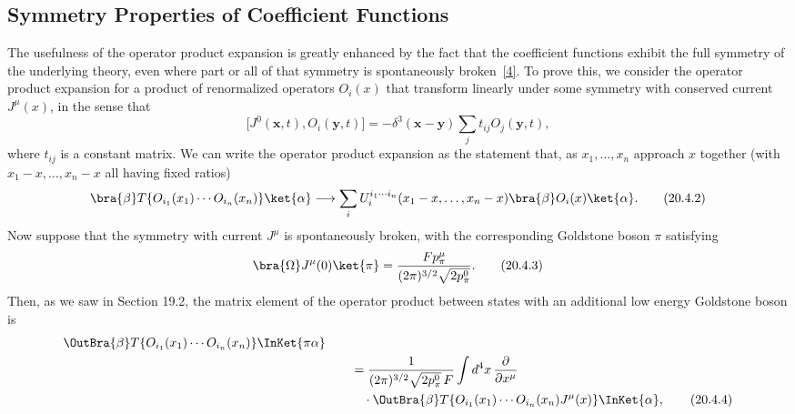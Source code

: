 
\subsection{Symmetry Properties of Coefficient Functions}

The usefulness of the operator product expansion is greatly enhanced by the fact that the coefficient functions exhibit the full symmetry of the underlying theory, even where part or all of that symmetry is spontaneously broken~\hyperref[ch20-ref-4]{[4]}. To prove this, we consider the operator product expansion for a product of renormalized operators $O_i(x)$ that transform linearly under some symmetry with conserved current $J^\mu(x)$, in the sense that
\begin{equation}
\bigl[J^0(\mathbf{x},t),O_i(\mathbf{y},t)\bigr]
=-\delta^3(\mathbf{x}-\mathbf{y})\sum_j t_{ij}O_j(\mathbf{y},t),
\tag{20.4.1}\label{eq:20.4.1}
\end{equation}
where $t_{ij}$ is a constant matrix. We can write the operator product expansion as the statement that, as $x_1,\ldots,x_n$ approach $x$ together (with $x_1-x,\ldots,x_n-x$ all having fixed ratios)
\begin{equation}
\bra{\beta}T\{O_{i_1}(x_1)\cdots O_{i_n}(x_n)\}\ket{\alpha}
\longrightarrow
\sum_i U_i^{i_1\cdots i_n}(x_1-x,\ldots,x_n-x)
\bra{\beta}O_i(x)\ket{\alpha}.
\tag{20.4.2}\label{eq:20.4.2}
\end{equation}
Now suppose that the symmetry with current $J^\mu$ is spontaneously broken, with the corresponding Goldstone boson $\pi$ satisfying
\begin{equation}
\bra{\Omega}J^\mu(0)\ket{\pi}
=\frac{Fp_\pi^\mu}{(2\pi)^{3/2}\sqrt{2p_\pi^0}}.
\tag{20.4.3}\label{eq:20.4.3}
\end{equation}
Then, as we saw in Section 19.2, the matrix element of the operator product between states with an additional low energy Goldstone boson is
\begin{align}
\OutBra{\beta}
T\{O_{i_1}(x_1)\cdots O_{i_n}(x_n)\}\InKet{\pi\alpha}
&\notag\\
&\qquad={}
\frac{1}{(2\pi)^{3/2}\sqrt{2p_\pi^0}\,F}
\int d^4x\,\frac{\partial}{\partial x^\mu}
\notag\\
&\qquad\quad{}\cdot\OutBra{\beta}
T\{O_{i_1}(x_1)\cdots O_{i_n}(x_n)J^\mu(x)\}
\InKet{\alpha},
\tag{20.4.4}\label{eq:20.4.4}
\end{align}
